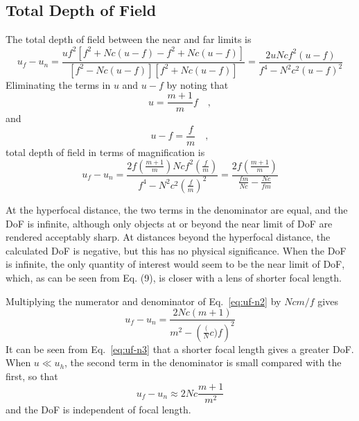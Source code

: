 \documentclass[11pt, oneside]{scrartcl}   	%
\begin{document}
\subsection{Total Depth of Field}

The total depth of field between the near and far limits is
\begin{equation}
     u_f-u_n = \frac{uf^2 \left[f^2 +Nc(u- f)- f^2 +Nc(u-f)\right]}{\left[f^2 -Nc(u-f)\right]\left[f^2 +Nc(u-f)\right]} = 
     \frac{ 2uNcf^2 (u- f)}{f^4 -N^2c^2(u-f)^2}
   \label{eq:uf-n1}
\end{equation}
Eliminating the terms in $u$ and $u - f$ by noting that 
\begin{equation}
u = \frac{m+1}m f\quad ,
\end{equation}
and
\begin{equation}
    u-f = \frac f m\quad,
\end{equation}
total depth of field in terms of magnification is
\begin{equation}
u_f-u_n = \frac{2f\left(\frac{m+1}m\right)Ncf^2\left(\frac f m\right)}{f^4 -N^2c^2\left(\frac f m\right)^2} = \frac{2f\left(\frac{m+1}m\right)}{\frac{fm}{Nc}-\frac{Nc}{fm}}
\label{eq:uf-n2}
\end{equation}

At the hyperfocal distance, the two terms in the denominator are equal, and the DoF is infinite, although only objects at or beyond the near limit of DoF are rendered acceptably sharp. At distances beyond the hyperfocal distance, the calculated DoF is negative, but this has no physical significance. When the DoF is infinite, the only quantity of interest would seem to be the near limit of DoF, which, as can be seen from Eq. (9), is closer with a lens of shorter focal length.

Multiplying the numerator and denominator of Eq.~\ref{eq:uf-n2} by $Ncm/f$
gives
\begin{equation}
   u_f-u_n = \frac{2Nc(m+1)}{m^2-\left(\frac(Nc)f\right)^2}
      \label{eq:uf-n3}
\end{equation}
It can be seen from Eq.~\ref{eq:uf-n3} that a shorter focal length
gives a greater DoF. When $u \ll u_h$, the second term in the denominator is small compared with the first, so that
\begin{equation}
   u_f-u_n \approx 2Nc\frac{m+1}{m^2}
   \label{eq:uf-n4}
\end{equation}
and the DoF is independent of focal length.
\end{document}
